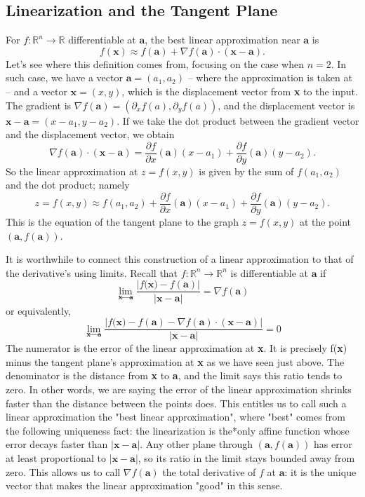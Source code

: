\documentclass{article}
\begin{document}
\subsection{Linearization and the Tangent Plane}

For $f: \mathbb{R}^n \to \mathbb{R}$ differentiable at $\mathbf{a}$, the best linear approximation near $\mathbf{a}$ is
$$f(\mathbf{x}) \approx f(\mathbf{a}) + \nabla f(\mathbf{a}) \cdot (\mathbf{x} - \mathbf{a}).$$
Let's see where this definition comes from, focusing on the case when $n = 2$. In such case, we have a vector $\textbf{a}=(a_1, a_2)$ -- where the approximation is taken at -- and a vector $\textbf{x}=(x,y)$, which is the displacement vector from \textbf{x} to the input. The gradient is $\nabla f(\textbf{a})=(\partial_x f(a), \partial_y f(a))$, and the displacement vector is $\textbf{x}-\textbf{a}=(x-a_1, y-a_2)$. If we take the dot product between the gradient vector and the displacement vector, we obtain 
$$\nabla f(\textbf{a}) \cdot (\textbf{x}-\textbf{a})=\frac{\partial f}{\partial x}(\textbf{a})(x-a_1) + \frac{\partial f}{\partial y} (\textbf{a})(y-a_2).$$
So the linear approximation at $z=f(x,y)$ is given by the sum of $f(a_1, a_2)$ and the dot product; namely
$$z=f(x,y) \approx f(a_1,a_2)+\frac{\partial f}{\partial x}(\textbf{a})(x-a_1) + \frac{\partial f}{\partial y}(\textbf{a})(y-a_2).$$
This is the equation of the tangent plane to the graph $z = f(x, y)$ at the point $(\mathbf{a}, f(\mathbf{a}))$. 

It is worthwhile to connect this construction of a linear approximation to that of the derivative's using limits. Recall that $f : \mathbb{R}^n \to \mathbb{R}^n$ is differentiable at $\textbf{a}$ if 
$$\lim_{\textbf{x} \to \textbf{a}}\frac{|f(\textbf{x)}-f(\textbf{a})|}{|\textbf{x}-\textbf{a}|}=\nabla f(\textbf{a})$$
or equivalently,
$$\lim_{\textbf{x} \to \textbf{a}}\frac{|f(\textbf{x)}-f(\textbf{a})-\nabla f(\textbf{a}) \cdot (\textbf{x}-\textbf{a})|}{|\textbf{x}-\textbf{a}|}=0$$
The numerator is the error of the linear approximation at \textbf{x}. It is precisely f(\textbf{x}) minus the tangent plane's approximation at \textbf{x} as we have seen just above. The denominator is the distance from \textbf{x} to \textbf{a}, and the limit says this ratio tends to zero. In other words, we are saying the error of the linear approximation shrinks faster than the distance between the points does. This entitles us to call such a linear approximation the "best linear approximation", where "best" comes from the following uniqueness fact: the linearization is the*only affine function whose error decays faster than $|\mathbf{x} - \mathbf{a}|$. Any other plane through $(\mathbf{a}, f(\mathbf{a}))$ has error at least proportional to $|\mathbf{x} - \mathbf{a}|$, so its ratio in the limit stays bounded away from zero. This allows us to call $\nabla f(\mathbf{a})$ the total derivative of $f$ at $\mathbf{a}$: it is the unique vector that makes the linear approximation "good" in this sense.
\end{document}
